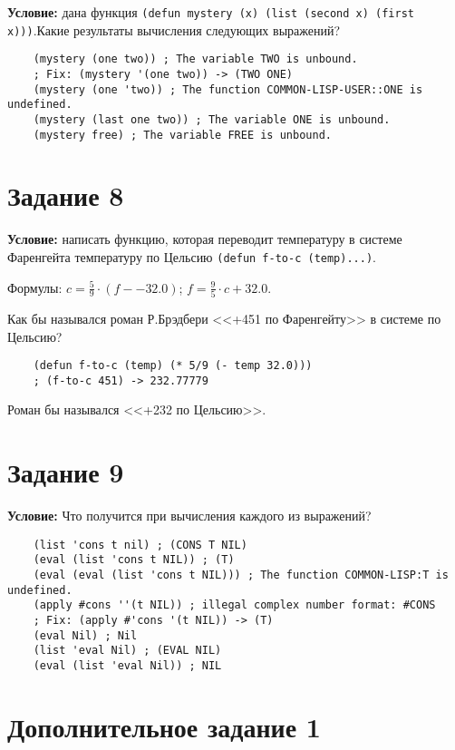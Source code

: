 \textbf{Условие:} дана функция \texttt{(defun mystery (x) (list (second x) (first x)))}.Какие результаты вычисления следующих выражений? 

\begin{lstlisting}
	(mystery (one two)) ; The variable TWO is unbound.
	; Fix: (mystery '(one two)) -> (TWO ONE)
	(mystery (one 'two)) ; The function COMMON-LISP-USER::ONE is undefined.
	(mystery (last one two)) ; The variable ONE is unbound.
	(mystery free) ; The variable FREE is unbound.
\end{lstlisting}


\section{Задание 8}

\textbf{Условие:} написать функцию, которая переводит температуру в системе Фаренгейта температуру по Цельсию \texttt{(defun f-to-c (temp)...)}. 

Формулы: $c = \frac{5}{9} \cdot (f -- 32.0)$; $f= \frac{9}{5} \cdot c + 32.0$. 

Как бы назывался роман Р.Брэдбери <<+451 по Фаренгейту>> в системе по Цельсию?

\begin{lstlisting}
	(defun f-to-c (temp) (* 5/9 (- temp 32.0)))
	; (f-to-c 451) -> 232.77779
\end{lstlisting}

Роман бы назывался <<+232 по Цельсию>>.


\section{Задание 9}

\textbf{Условие:} Что получится при вычисления каждого из выражений?

\begin{lstlisting}
	(list 'cons t nil) ; (CONS T NIL)
	(eval (list 'cons t NIL)) ; (T)
	(eval (eval (list 'cons t NIL))) ; The function COMMON-LISP:T is undefined.
	(apply #cons ''(t NIL)) ; illegal complex number format: #CONS
	; Fix: (apply #'cons '(t NIL)) -> (T)
	(eval Nil) ; Nil
	(list 'eval Nil) ; (EVAL NIL)
	(eval (list 'eval Nil)) ; NIL
\end{lstlisting}


\section{Дополнительное задание 1}

